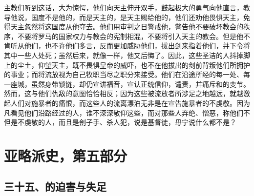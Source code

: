 主教们听到这话，大为惊愕，他们向天主伸开双手，鼓起极大的勇气向他直言，教导他说，国度不是他的，而是天主的，是天主赐给他的，他们还劝他畏惧天主，免得天主忽然将这国度从他夺去。他们用审判之日警戒他，警告他不要破坏教会的秩序，不要将罗马的国家权力与教会的宪制相混，不要将引入天主的教会。但是他不肯听从他们，也不许他们多言，反而更加威胁他们，拔出剑来指着他们，并下令将其中一些人处死；虽然后来，就像一样，他又后悔了。因此，这些圣洁的人抖掉脚上的尘土，仰望天主，既不畏惧皇帝的威吓，也不在他拔出的剑前背叛他们所拥护的事业；而将流放视为自己牧职当尽之职分来接受。他们在沿途所经的每一处、每一座城，虽然身带锁链，却仍宣讲福音，宣认正统信仰，谴责，并痛斥和的变节。然而，这与他们仇敌的意图恰恰相反；因为这些被流放者所涉足之地越远，就越激起人们对施暴者的痛恨，而这些人的流离漂泊无非是在宣告施暴者的不虔敬。因为凡看见他们沿路经过的人，谁不深深敬仰这些，而对那些人弃绝、憎恶，称他们不但是不虔敬的人，而且是刽子手、杀人犯，说是基督徒，毋宁说什么都不是？\par



\section{亚略派史，第五部分}

\par


\subsection{三十五、的迫害与失足}

